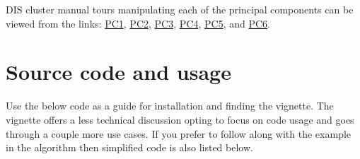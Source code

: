 \documentclass{monashthesis}
\theoremstyle{definition}
\theoremstyle{definition}
\theoremstyle{definition}
\theoremstyle{remark}
\begin{document}
DIS cluster manual tours manipulating each of the principal components
can be viewed from the links:
\href{https://nspyrison.netlify.com/thesis/discluster_manualtour_pc1/}{PC1},
\href{https://nspyrison.netlify.com/thesis/discluster_manualtour_pc2/}{PC2},
\href{https://nspyrison.netlify.com/thesis/discluster_manualtour_pc3/}{PC3},
\href{https://nspyrison.netlify.com/thesis/discluster_manualtour_pc4/}{PC4},
\href{https://nspyrison.netlify.com/thesis/discluster_manualtour_pc5/}{PC5},
and
\href{https://nspyrison.netlify.com/thesis/discluster_manualtour_pc6/}{PC6}.

\section{Source code and usage}\label{sec:usage}

Use the below code as a guide for installation and finding the vignette.
The vignette offers a less technical discussion opting to focus on code
usage and goes through a couple more use cases. If you prefer to follow
along with the example in the algorithm then simplified code is also
listed below.
\end{document}
